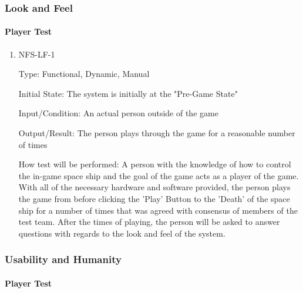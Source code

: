 \documentclass[12pt, titlepage]{article}
\begin{document}
\subsubsection{Look and Feel}
		
\paragraph{Player Test}

\begin{enumerate}

\item{NFS-LF-1\\}

Type: Functional, Dynamic, Manual
					
Initial State: The system is initially at the "Pre-Game State"
					
Input/Condition: An actual person outside of the game 
					
Output/Result: The person plays through the game for a reasonable number of times
					
How test will be performed: A person with the knowledge of how to control the in-game space ship and the goal of the game acts as a player of the game. With all of the necessary hardware and software provided, the person plays the game from before clicking the 'Play' Button to the 'Death' of the space ship for a number of times that was agreed with consensus of members of the test team. After the times of playing, the person will be asked to answer questions with regards to the look and feel of the system. 

\end{enumerate}

\subsubsection{Usability and Humanity}

\paragraph{Player Test}
\end{document}
